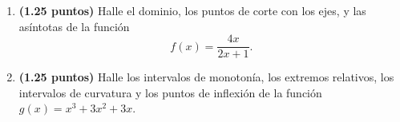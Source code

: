 
\begin{enumerate}[label=\alph*)]
\item \textbf{(1.25 puntos)} Halle el dominio, los puntos de corte con los ejes, y las asíntotas de la función
\[
f(x)=\frac{4x}{2x+1}.
\]
\item \textbf{(1.25 puntos)} Halle los intervalos de monotonía, los extremos relativos, los intervalos de curvatura y los puntos de inflexión de la función $g(x)=x^3+3x^2+3x$.
\end{enumerate}
